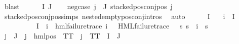 \begin{isabellebody}
\ blast\isanewline
{}\isamarkupfalse%
\isanewline
\ \ \isamarkupfalse%
\ {\isacharparenleft}{\kern0pt}{}\ {\isasymPhi}\ I\ J{\isacharparenright}{\kern0pt}\isanewline
\ \ \isamarkupfalse%
\ neg{\isacharunderscore}{\kern0pt}case{\isacharcolon}{\kern0pt}\ {\isachardoublequoteopen}{\isasymforall}j{\isasymin}{\isasymPhi}\ {\isacharbackquote}{\kern0pt}\ J{\isachardot}{\kern0pt}\ stacked{\isacharunderscore}{\kern0pt}pos{\isacharunderscore}{\kern0pt}conj{\isacharunderscore}{\kern0pt}pos\ j{\isachardoublequoteclose}\ \isanewline
\ \ \ \ \isamarkupfalse%
\ stacked{\isacharunderscore}{\kern0pt}pos{\isacharunderscore}{\kern0pt}conj{\isacharunderscore}{\kern0pt}pos{\isachardot}{\kern0pt}simps\ nested{\isacharunderscore}{\kern0pt}empty{\isacharunderscore}{\kern0pt}pos{\isacharunderscore}{\kern0pt}conj{\isachardot}{\kern0pt}intros{\isacharparenleft}{\kern0pt}{}{\isacharparenright}{\kern0pt}\ \isamarkupfalse%
\ auto\isanewline
\ \ \isamarkupfalse%
\ {\isachardoublequoteopen}{\isasymPhi}\ {\isacharbackquote}{\kern0pt}\ I\ {\isacharequal}{\kern0pt}\ {\isacharbraceleft}{\kern0pt}{\isacharbraceright}{\kern0pt}{\isachardoublequoteclose}\isanewline
{\isacharbar}{\kern0pt}\ {\isachardoublequoteopen}{\isacharparenleft}{\kern0pt}{\isasymexists}i{\isasymin}{\isasymPhi}\ {\isacharbackquote}{\kern0pt}\ I{\isachardot}{\kern0pt}\isanewline
\ \ \ \ \ \ \ \ {\isasymPhi}\ {\isacharbackquote}{\kern0pt}\ I\ {\isacharequal}{\kern0pt}\ {\isacharbraceleft}{\kern0pt}i{\isacharbraceright}{\kern0pt}\ {\isasymand}\ hml{\isacharunderscore}{\kern0pt}failure{\isacharunderscore}{\kern0pt}trace\ i\ {\isasymand}\ {\isacharparenleft}{\kern0pt}{\isasymexists}{\isasympsi}{\isachardot}{\kern0pt}\ HML{\isacharunderscore}{\kern0pt}failure{\isacharunderscore}{\kern0pt}trace\ {\isasympsi}\ {\isasymand}\ {\isacharparenleft}{\kern0pt}{\isasymforall}s{\isachardot}{\kern0pt}\ {\isacharparenleft}{\kern0pt}s\ {\isasymTurnstile}\ i{\isacharparenright}{\kern0pt}\ {\isacharequal}{\kern0pt}\ {\isacharparenleft}{\kern0pt}s\ {\isasymTurnstile}\ {\isasympsi}{\isacharparenright}{\kern0pt}{\isacharparenright}{\kern0pt}{\isacharparenright}{\kern0pt}{\isacharparenright}{\kern0pt}\isanewline
{\isasymand}\ {\isacharparenleft}{\kern0pt}{\isasymforall}j{\isasymin}{\isasymPhi}\ {\isacharbackquote}{\kern0pt}\ J{\isachardot}{\kern0pt}\ {\isasymexists}{\isasymalpha}{\isachardot}{\kern0pt}\ j\ {\isacharequal}{\kern0pt}\ hml{\isacharunderscore}{\kern0pt}pos\ {\isasymalpha}\ TT\ {\isasymor}\ j\ {\isacharequal}{\kern0pt}\ TT{\isacharparenright}{\kern0pt}\ {\isasymand}\ I\ {\isasyminter}\ J\ {\isacharequal}{\kern0pt}\ {\isacharbraceleft}{\kern0pt}{\isacharbraceright}{\kern0pt}{\isachardoublequoteclose}\isanewline

\end{isabellebody}
